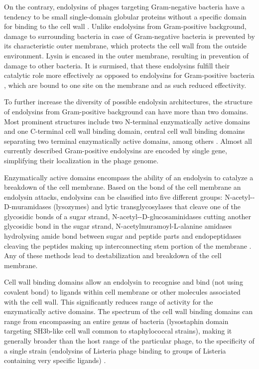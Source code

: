 On the contrary, endolysins of phages targeting Gram-negative bacteria have a tendency to be small single-domain globular proteins without a specific domain for binding to the cell wall \cite{schmelcher2012bacteriophage}. Unlike endolysins from Gram-positive background, damage to surrounding bacteria in case of Gram-negative bacteria is prevented by its characteristic outer membrane, which protects the cell wall from the outside environment. Lysin is encased in the outer membrane, resulting in prevention of damage to other bacteria. It is surmised, that these endolysins fulfill their catalytic role more effectively as opposed to endolysins for Gram-positive bacteria \cite{schmelcher2012bacteriophage}, which are bound to one site on the membrane and as such reduced effectivity.

To further increase the diversity of possible endolysin architectures, the structure of endolysins from Gram-positive background can have more than two domains. Most prominent structures include two N-terminal enzymatically active domains and one C-terminal cell wall binding domain, central cell wall binding domains separating two terminal enzymatically active domains, among others \cite{schmelcher2012bacteriophage}. Almost all currently described Gram-positive endolysins are encoded by single gene, simplifying their localization in the phage genome.

Enzymatically active domains encompass the ability of an endolysin to catalyze a breakdown of the cell membrane. Based on the bond of the cell membrane an endolysin attacks, endolysins can be classified into five different groups: N-acetyl-\textbeta-D-muramidases (lysozymes) and lytic transglycosylases that cleave one of the glycosidic bonds of a sugar strand, N-acetyl-\textbeta-D-glucosaminidases cutting another glycosidic bond in the sugar strand, N-acetylmuramoyl-L-alanine amidases hydrolysing amide bond between sugar and peptide parts and endopeptidases cleaving the peptides making up interconnecting stem portion of the membrane \cite{schmelcher2012bacteriophage}. Any of these methods lead to destabilization and breakdown of the cell membrane.

Cell wall binding domains allow an endolysin to recognise and bind (not using covalent bond) to ligands within cell membrane or other molecules associated with the cell wall. This significantly reduces range of activity for the enzymatically active domains. The spectrum of the cell wall binding domains can range from encompassing an entire genus of bacteria (lysostaphin domain targeting SH3b-like cell wall common to staphylococcal strains), making it generally broader than the host range of the particular phage, to the specificity of a single strain (endolysins of Listeria phage binding to groups of Listeria containing very specific ligands) \cite{schmelcher2012bacteriophage}.

